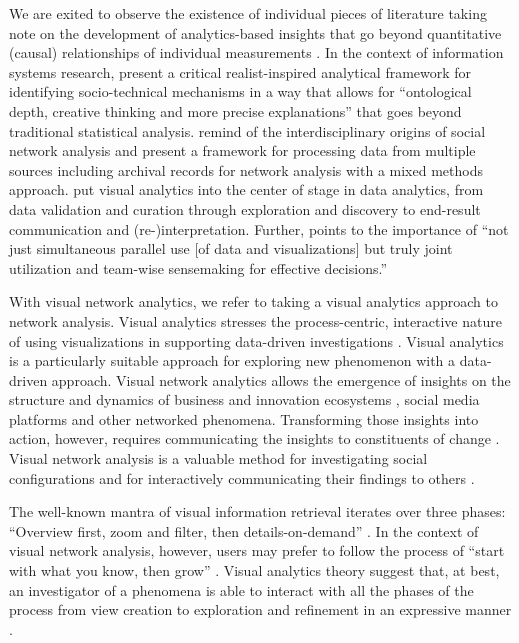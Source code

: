 We are exited to observe the existence of individual pieces of literature taking note on the development of analytics-based insights that go beyond quantitative (causal) relationships of individual measurements \citep{Bygstad2011InAnalysis,Bendoly2016FitAnalytics,Williams2015MixedAnalysis}. In the context of information systems research, \citep{Bygstad2011InAnalysis} present a critical realist-inspired analytical framework for identifying socio-technical mechanisms in a way that allows for ``ontological depth, creative thinking and more precise explanations'' that goes beyond traditional statistical analysis. \cite{Williams2015MixedAnalysis} remind of the interdisciplinary origins of social network analysis and present a framework for processing data from multiple sources including archival records for network analysis with a mixed methods approach. \cite{Bendoly2016FitAnalytics} put visual analytics into the center of stage in data analytics, from data validation and curation through exploration and discovery to end-result communication and (re-)interpretation. Further, \citeauthor{Bendoly2016FitAnalytics} points to the importance of ``not just simultaneous parallel use [of data and visualizations] but truly joint utilization and team-wise sensemaking for effective decisions.''

With visual network analytics, we refer to taking a visual analytics \citep{Thomas2006AAgenda,Heer2012InteractiveAnalysis} approach to network analysis. Visual analytics stresses the process-centric, interactive nature of using visualizations in supporting data-driven investigations \citep{Keim2010MasteringAnalytics,Heer2012InteractiveAnalysis}. Visual analytics is a particularly suitable approach for exploring new phenomenon with a data-driven approach. Visual network analytics allows the emergence of insights on the structure and dynamics of business and innovation ecosystems \citep{Basole2009VisualizationEcosystem}, social media platforms \citep{Smith2015TheConversations} and other networked phenomena. Transforming those insights into action, however, requires communicating the insights to constituents of change \citep{Russell2011TransformingOrchestration,Still2014InsightsVisualisations}. Visual network analysis is a valuable method for investigating social configurations and for interactively communicating their findings to others \citep{Freeman2000VisualizingNetworks}.

The well-known mantra of visual information retrieval iterates over three phases: ``Overview first, zoom and filter, then details-on-demand'' \citep{Shneiderman1996TheVisualizations}.
In the context of visual network analysis, however, users may prefer to follow the process of ``start with what you know, then grow'' \citep[][p. 35]{Heer2005}. Visual analytics theory suggest that, at best, an investigator of a phenomena is able to interact with all the phases of the process from view creation to exploration and refinement in an expressive manner \citep{Heer2012InteractiveAnalysis}.

